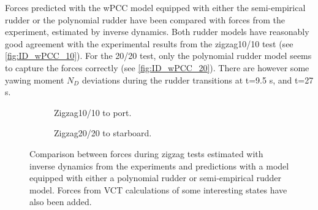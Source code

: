 Forces predicted with the wPCC model equipped with either the semi-empirical rudder or the polynomial rudder have been compared with forces from the experiment, estimated by inverse dynamics. Both rudder models have reasonably good agreement with the experimental results from the zigzag10/10 test (see \autoref{fig:ID_wPCC_10}). For the 20/20 test, only the polynomial rudder model seems to capture the forces correctly (see \autoref{fig:ID_wPCC_20}). There are however some yawing moment $N_D$ deviations during the rudder transitions at t=9.5 s, and t=27 s.

\begin{figure}
     \centering
     \begin{subfigure}[b]{\textwidth}
         \centering
         
        \caption{Zigzag10/10 to port.}
        \label{fig:ID_wPCC_10}
     \end{subfigure}
     \vfill
     \begin{subfigure}[b]{\textwidth}
         
        \caption{Zigzag20/20 to starboard.}
        \label{fig:ID_wPCC_20}
     \end{subfigure}
        \caption{Comparison between forces during zigzag tests estimated with inverse dynamics from the experiments and predictions with a model equipped with either a polynomial rudder or semi-empirical rudder model. Forces from VCT calculations of some interesting states have also been added.}
        \label{fig:ID_wPCC}
\end{figure}